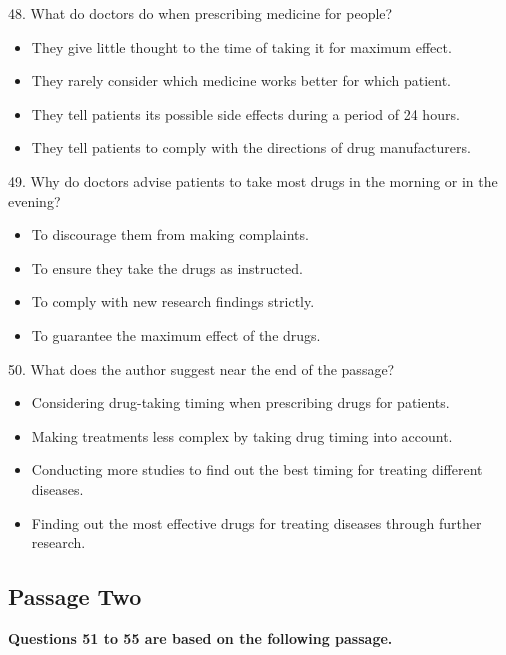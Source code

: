 \documentclass[UTF8,11pt]{ctexart}
\begin{document}
48. What do doctors do when prescribing medicine for people?


\begin{itemize}[leftmargin=2em,itemsep=.2em,topsep=.4em]\item[A.] They give little thought to the time of taking it for maximum effect.
\item[B.] They rarely consider which medicine works better for which patient.
\item[C.] They tell patients its possible side effects during a period of 24 hours.
\item[D.] They tell patients to comply with the directions of drug manufacturers.
\end{itemize}

49. Why do doctors advise patients to take most drugs in the morning or in the evening?


\begin{itemize}[leftmargin=2em,itemsep=.2em,topsep=.4em]\item[A.] To discourage them from making complaints.
\item[B.] To ensure they take the drugs as instructed.
\item[C.] To comply with new research findings strictly.
\item[D.] To guarantee the maximum effect of the drugs.
\end{itemize}

50. What does the author suggest near the end of the passage?


\begin{itemize}[leftmargin=2em,itemsep=.2em,topsep=.4em]\item[A.] Considering drug-taking timing when prescribing drugs for patients.
\item[B.] Making treatments less complex by taking drug timing into account.
\item[C.] Conducting more studies to find out the best timing for treating different diseases.
\item[D.] Finding out the most effective drugs for treating diseases through further research.
\end{itemize}

\subsection*{\textbf{Passage Two}}


\textbf{Questions 51 to 55 are based on the following passage.}
\end{document}
